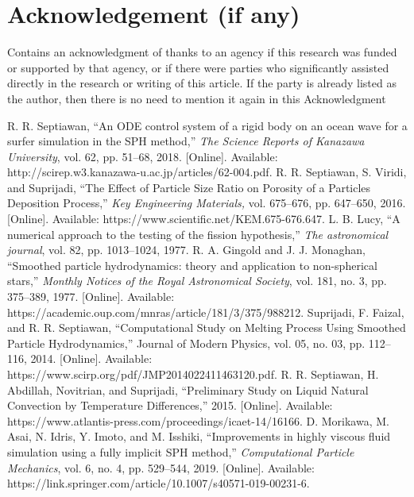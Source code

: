 \documentclass{article}
\begin{document}
\section{Acknowledgement (if any)}
Contains an acknowledgment of thanks to an agency if this research was funded or supported by that agency, or if there were parties who significantly assisted directly in the research or writing of this article. If the party is already listed as the author, then there is no need to mention it again in this Acknowledgment


\begin{thebibliography}{1.7} 
	 \color{cyan}R. R. Septiawan, “An ODE control system of a rigid body on an ocean wave for a surfer simulation in the SPH method,” \textit{The Science Reports of Kanazawa University}, vol. 62, pp. 51–68, 2018. [Online]. Available: http://scirep.w3.kanazawa-u.ac.jp/articles/62-004.pdf. \color{black}
	 \color{cyan}R. R. Septiawan, S. Viridi, and Suprijadi, “The Effect of Particle Size Ratio on Porosity of a Particles Deposition Process,” \textit{Key Engineering Materials,} vol. 675–676, pp. 647–650, 2016. [Online]. Available: https://www.scientific.net/KEM.675-676.647. \color{black}
	 \color{cyan}L. B. Lucy, “A numerical approach to the testing of the fission hypothesis,” \textit{The astronomical journal}, vol. 82, pp. 1013–1024, 1977. \color{black}
	 \color{cyan}R. A. Gingold and J. J. Monaghan, “Smoothed particle hydrodynamics: theory and application to non-spherical stars,” \textit{Monthly Notices of the Royal Astronomical Society}, vol. 181, no. 3, pp. 375–389, 1977. [Online]. Available:  https://academic.oup.com/mnras/article/181/3/375/988212. \color{black}
	 \color{cyan}Suprijadi, F. Faizal, and R. R. Septiawan, “Computational Study on Melting Process Using Smoothed Particle Hydrodynamics,” Journal of Modern Physics, vol. 05, no. 03, pp. 112–116, 2014. [Online]. Available: https://www.scirp.org/pdf/JMP2014022411463120.pdf.\color{black}
	 \color{cyan}R. R. Septiawan, H. Abdillah, Novitrian, and Suprijadi, “Preliminary Study on Liquid Natural Convection by Temperature Differences,” 2015. [Online]. Available: https://www.atlantis-press.com/proceedings/icaet-14/16166.\color{black}
	\color{cyan}D. Morikawa, M. Asai, N. Idris, Y. Imoto, and M. Isshiki, “Improvements in highly viscous fluid simulation using a fully implicit SPH method,” \textit{Computational Particle Mechanics}, vol. 6, no. 4, pp. 529–544, 2019. [Online]. Available: https://link.springer.com/article/10.1007/s40571-019-00231-6.\color{black}

\end{thebibliography}
\end{document}
